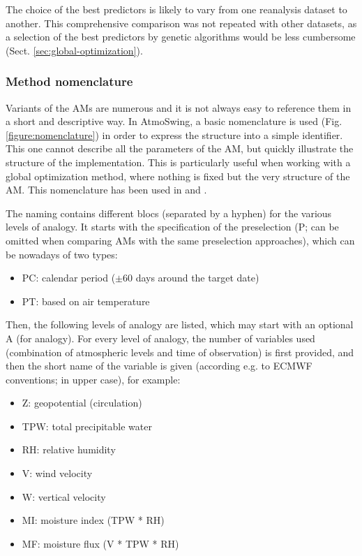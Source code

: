 \documentclass[review]{elsarticle}
\begin{document}
The choice of the best predictors is likely to vary from one reanalysis dataset to another. This comprehensive comparison was not repeated with other datasets, as a selection of the best predictors by genetic algorithms would be less cumbersome (Sect. \ref{sec:global-optimization}).


\subsubsection{Method nomenclature}

Variants of the AMs are numerous and it is not always easy to reference them in a short and descriptive way. In AtmoSwing, a basic nomenclature is used (Fig. \ref{figure:nomenclature}) in order to express the structure into a simple identifier. This one cannot describe all the parameters of the AM, but quickly illustrate the structure of the implementation. This is particularly useful when working with a global optimization method, where nothing is fixed but the very structure of the AM. This nomenclature has been used in \citet{Horton2017a, Horton2017b, Horton2018a} and \citet{Horton2018b}.

The naming contains different blocs (separated by a hyphen) for the various levels of analogy. It starts with the specification of the preselection (P; can be omitted when comparing AMs with the same preselection approaches), which can be nowadays of two types:
\begin{itemize}
	\item PC: calendar period ($\pm 60$ days around the target date)
	\item PT: based on air temperature \citep{BenDaoud2010}
\end{itemize}

Then, the following levels of analogy are listed, which may start with an optional A (for analogy). For every level of analogy, the number of variables used (combination of atmospheric levels and time of observation) is first provided, and then the short name of the variable is given (according e.g. to ECMWF conventions; in upper case), for example:
\begin{itemize}
	\item Z: geopotential (circulation)
	\item TPW: total precipitable water
	\item RH: relative humidity
	\item V: wind velocity
	\item W: vertical velocity
	\item MI: moisture index (TPW * RH)
	\item MF: moisture flux (V * TPW * RH)
\end{itemize}
\end{document}
